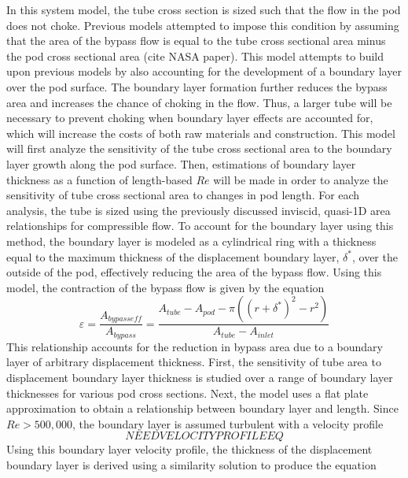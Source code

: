In this system model, the tube cross section is sized such that the flow in the pod does not choke. Previous models attempted to impose this condition by assuming that the area of the bypass flow is equal to the tube cross sectional area minus the pod cross sectional area (cite NASA paper). This model attempts to build upon previous models by also accounting for the development of a boundary layer over the pod surface. The boundary layer formation further reduces the bypass area and increases the chance of choking in the flow. Thus, a larger tube will be necessary to prevent choking when boundary layer effects are accounted for, which will increase the costs of both raw materials and construction. This model will first analyze the sensitivity of the tube cross sectional area to the boundary layer growth along the pod surface. Then, estimations of boundary layer thickness as a function of length-based $Re$ will be made in order to analyze the sensitivity of tube cross sectional area to changes in pod length.
For each analysis, the tube is sized using the previously discussed inviscid, quasi-1D area relationships for compressible flow. To account for the boundary layer using this method, the boundary layer is modeled as a cylindrical ring with a thickness equal to the maximum thickness of the displacement boundary layer, $\delta^{*}$, over the outside of the pod, effectively reducing the area of the bypass flow. Using this model, the contraction of the bypass flow is given by the equation
\begin{equation}
	\label{eq:epsilon}
	\varepsilon  = \frac{A_{bypass eff}}{A_{bypass}} = \frac{A_{tube}-A_{pod} -\pi  (  ( r+\delta ^{*}  )^{2}-r^{2}  )}{A_{tube}-A_{inlet}}
\end{equation}
This relationship accounts for the reduction in bypass area due to a boundary layer of arbitrary displacement thickness. First, the sensitivity of tube area to displacement boundary layer thickness is studied over a range of boundary layer thicknesses for various pod cross sections. Next, the model uses a flat plate approximation to obtain a relationship between boundary layer and length. Since $Re > 500,000$, the boundary layer is assumed turbulent with a velocity profile \cite{FoxAndMcDonald}  
\begin{equation}
	\label{eq:boundary_layer_profile}
	NEED VELOCITY PROFILE EQ
\end{equation}
Using this boundary layer velocity profile, the thickness of the displacement boundary layer is derived using a similarity solution to produce the equation \cite{FoxAndMcDonald}
